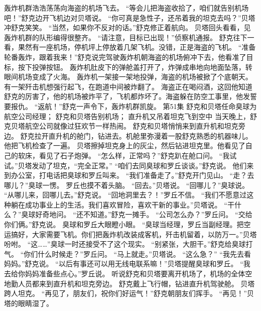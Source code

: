 \documentclass[a4paper,12pt,UTF8,twoside]{ctexbook}
\begin{document}
        轰炸机群浩浩荡荡向海盗的机场飞去。 
        “等会儿把海盗收拾了，咱们就告别机场吧！”舒克边开飞机边对贝塔说。 
        “你可真是急性子，还吊着我的坦克去吗？”贝塔冲舒克笑笑。 
        “当然，如果你不反对的话。”舒克修正着航向。 
        贝塔回头看看，见轰炸机群的队形编得很整齐。 
        “请注意，目标已出现！”侦察机通报。 
        舒克往下一看，果然有一座机场，停机坪上停放着几架飞机。没错，正是海盗的飞机。 
        “准备轮番轰炸，跟着我来！”舒克说完驾驶轰炸机朝海盗的机场俯冲下去，他看准了目标，按下投弹按钮。 
        轰炸机肚皮下的弹舱盖打开了，炸弹成串地向地面坠落，转眼间机场变成了火海。 
        轰炸机一架接一架地投弹，海盗的机场被掀了个底朝天。有一架歼击机想强行起飞，在跑道中间被炸翻了。 
        海盗正在喝闷酒，这回他知道舒克的厉害了，他的机场被炸平了，飞机都炸坏了。海盗躲在防空工事里，他发誓要报仇。 
        “返航！”舒克一声令下，轰炸机群凯旋。   第51集 
        舒克和贝塔任命臭球为航空公司经理； 
        舒克和贝塔告别机场； 
        直升机又吊着坦克飞到空中   
        当天晚上，舒克贝塔航空公司就像过狂欢节一样热闹。 
        舒克和贝塔悄悄来到直升机和坦克旁边。 
        舒克拉开直升机的舱门，钻进去。机舱里弥漫着一股舒克熟悉的机器味儿。他把飞机检查了一遍。 
        贝塔擦掉坦克身上的灰尘，然后钻进坦克里。他看见了自己的软床，看见了石子炮弹。 
        “怎么样，正常吗？”舒克趴在舱口问。 
        “我试试。”贝塔发动了坦克，“完全正常。” 
        “咱们去同臭球和罗丘谈谈。”舒克说。 
        他们来到办公室，打电话把臭球和罗丘叫来。 
        “我们准备走了。”舒克开门见山。 
        “走？去哪儿？”臭球一愣。 
        罗丘也摸不着头脑。 
        “回去。”贝塔说。 
        “回哪儿？”臭球说。 
        “从哪儿来，回哪儿去。”舒克说。 
        “回地洞里去？！”罗丘不信。 
        “我们不愿意过这种躺在成功事业上的生活。我们喜欢冒险，喜欢干新的事业。”贝塔说。 
        “干什么？”臭球好奇地问。 
        “还不知道。”舒克一摊手。 
        “公司怎么办？”罗丘问。 
        “交给你们俩。”舒克说。 
        臭球和罗丘大眼瞪小眼。 
        “臭球当经理，罗丘当副经理。把空运搞好，大家需要飞机。你们把轰炸机改装成客机，歼击机留着，以防万一。”贝塔吩咐。 
        “这……”臭球一时还接受不了这个现实。 
        “别紧张，大胆干。”舒克给臭球打气。 
        “你们什么时候走？”罗丘问。 
        “马上就走。”贝塔说。 
        “这么急？” 
        “我先去看妈妈。”舒克说。 
        “以后有事还可以用无线电联系嘛！”贝塔提醒臭球和罗丘。 
        “我去给你妈妈准备些点心。”罗丘说。 
        听说舒克和贝塔要离开机场了，机场的全体空地勤人员都来到直升机和坦克旁边。 
        舒克戴上飞行帽，钻进直升机驾驶舱。 
        贝塔跨人坦克。 
        “再见了，朋友们，祝你们好运气！”舒克朝朋友们挥手。 
        “再见！”贝塔的眼睛湿了。 
\end{document}
